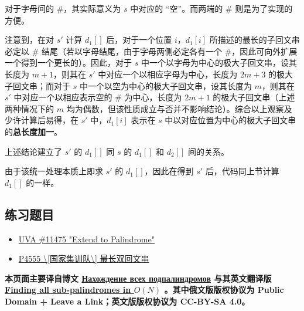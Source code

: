 对于字母间的 $\#$，其实际意义为 $s$ 中对应的 “空”。而两端的 $\#$ 则是为了实现的方便。

注意到，在对 $s'$ 计算 $d_1[]$ 后，对于一个位置 $i$，$d_1[i]$ 所描述的最长的子回文串必定以 $\#$ 结尾（若以字母结尾，由于字母两侧必定各有一个 $\#$，因此可向外扩展一个得到一个更长的）。因此，对于 $s$ 中一个以字母为中心的极大子回文串，设其长度为 $m + 1$，则其在 $s'$ 中对应一个以相应字母为中心，长度为 $2m + 3$ 的极大子回文串；而对于 $s$ 中一个以空为中心的极大子回文串，设其长度为 $m$，则其在 $s'$ 中对应一个以相应表示空的 $\#$ 为中心，长度为 $2m + 1$ 的极大子回文串（上述两种情况下的 $m$ 均为偶数，但该性质成立与否并不影响结论）。综合以上观察及少许计算后易得，在 $s'$ 中，$d_1[i]$ 表示在 $s​$ 中以对应位置为中心的极大子回文串的\textbf{总长度加一}。

上述结论建立了 $s'$ 的 $d_1[]$ 同 $s$ 的 $d_1[]$ 和 $d_2[]$ 间的关系。

由于该统一处理本质上即求 $s'$ 的 $d_1[]$，因此在得到 $s'$ 后，代码同上节计算 $d_1[]$ 的一样。

\subsection{练习题目}

\begin{itemize}
\item \href{https://uva.onlinejudge.org/index.php?option=com_onlinejudge&Itemid=8&page=show_problem&problem=2470}{UVA \#11475 "Extend to Palindrome"}
\item \href{https://www.luogu.org/problemnew/show/P4555}{P4555 \textbackslash{}[国家集训队\textbackslash{}] 最长双回文串}
\end{itemize}

\hr

\textbf{本页面主要译自博文 \href{http://e-maxx.ru/algo/palindromes_count}{Нахождение всех подпалиндромов} 与其英文翻译版 \href{https://cp-algorithms.com/string/manacher.html}{Finding all sub-palindromes in $O(N)$} 。其中俄文版版权协议为 Public Domain + Leave a Link；英文版版权协议为 CC-BY-SA 4.0。}
